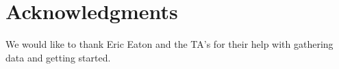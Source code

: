 \documentclass{article}
\begin{document}
%
%
%


\section*{Acknowledgments}

We would like to thank Eric Eaton and the TA's for their help with gathering data and getting started.





\end{document}
